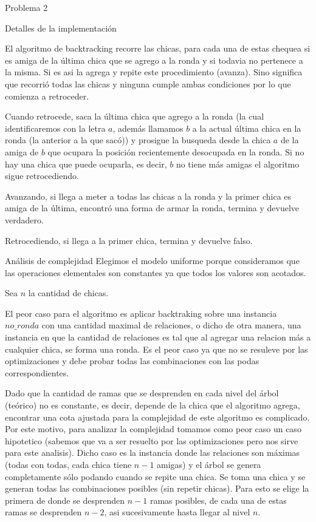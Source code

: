 \begin{section}{Problema 2}
\begin{subsection}{Detalles de la implementación}
\begin{itemize}
		\end{itemize}

		El algoritmo de backtracking recorre las chicas, para cada una de estas chequea si es amiga de la última chica que se agrego a la ronda y si todavia no pertenece a la misma. Si es asi la agrega y repite este procedimiento (avanza). Sino significa que recorrió todas las chicas y ninguna cumple ambas condiciones por lo que comienza a retroceder.

		Cuando retrocede, saca la última chica que agrego a la ronda (la cual identificaremos con la letra $a$, además llamamos $b$ a la actual última chica en la ronda (la anterior a la que sacó)) y prosigue la busqueda desde la chica $a$ de la amiga de $b$ que ocupara la posición recientemente desocupada en la ronda. Si no hay una chica que puede ocuparla, es decir, $b$ no tiene más amigas el algoritmo sigue retrocediendo.

		Avanzando, si llega a meter a todas las chicas a la ronda y la primer chica es amiga de la última, encontró una forma de armar la ronda, termina y devuelve verdadero.

		Retrocediendo, si llega a la primer chica, termina y devuelve falso.
	\end{subsection}
			
	\begin{subsection}{Análisis de complejidad}
			Elegimos el modelo uniforme porque consideramos que las operaciones elementales son constantes ya que todos los valores son acotados.\Pa
		
			Sea $n$ la cantidad de chicas.	
		
			El peor caso para el algoritmo es aplicar backtraking sobre una instancia $no\_ronda$ con una cantidad maximal de relaciones,
o dicho de otra manera, una instancia en que la cantidad de relaciones es tal que al agregar una relacion más a cualquier chica, se forma una ronda. Es el peor caso ya que no se resuleve por las optimizaciones y debe probar todas las combinaciones con las podas correspondientes.
			
			Dado que la cantidad de ramas que se desprenden en cada nivel del árbol (teórico) no es constante, es decir, depende de la chica que el algoritmo agrega, encontrar una cota ajustada para la complejidad de este algoritmo es complicado. Por este motivo, para analizar la complejidad tomamos como peor caso un caso hipotetico (sabemos que va a ser resuelto por las optimizaciones pero nos sirve para este analisis). Dicho caso es la instancia donde las relaciones son máximas (todas con todas, cada chica tiene $n-1$ amigas) y el árbol se genera completamente sólo podando cuando se repite una chica. Se toma una chica y se generan todas las combinaciones posibles (sin repetir chicas). Para esto se elige la primera de donde se desprenden $n-1$ ramas posibles, de cada una de estas ramas se desprenden $n-2$, asi sucesivamente hasta llegar al nivel $n$.


\end{subsection}
\end{section}
